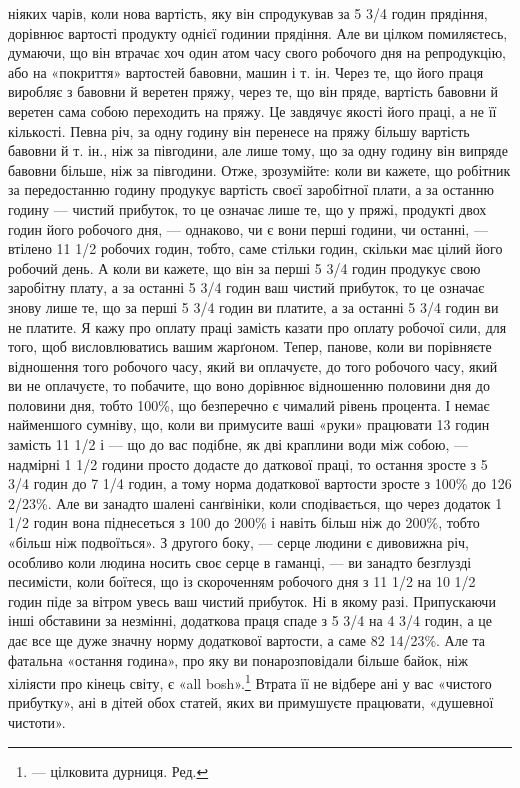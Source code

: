 ніяких чарів, коли нова вартість, яку він спродукував за 5 3/4 годин прядіння, дорівнює вартості
продукту однієї годинии прядіння. Але ви цілком помиляєтесь, думаючи, що він втрачає хоч один атом
часу свого робочого дня на репродукцію, або на «покриття» вартостей бавовни, машин і т. ін. Через
те, що його праця виробляє з бавовни й веретен пряжу, через те, що він пряде, вартість бавовни й
веретен сама собою переходить на пряжу.
Це завдячує якості його праці, а не її кількості. Певна річ, за одну годину він перенесе на пряжу
більшу вартість бавовни й т. ін., ніж за півгодини, але лише тому, що за одну годину він випряде
бавовни більше, ніж за півгодини. Отже, зрозумійте: коли ви кажете, що робітник за передостанню
годину продукує вартість своєї заробітної плати, а за останню годину — чистий прибуток, то це
означає лише те, що у пряжі, продукті двох годин його робочого дня, — однаково, чи є вони перші
години, чи останні, — втілено 11 1/2 робочих годин, тобто, саме стільки годин, скільки має цілий
його робочий день. А коли ви кажете, що він за перші 5 3/4 годин продукує свою заробітну плату, а за
останні 5 3/4 годин ваш чистий прибуток, то це означає знову лише те, що за перші 5 3/4 годин ви
платите, а за останні 5 3/4 годин
ви не платите. Я кажу про оплату праці замість казати про оплату робочої сили, для того, щоб
висловлюватись вашим жарґоном. Тепер, панове, коли ви порівняєте відношення того робочого
часу, який ви оплачуєте, до того робочого часу, який ви не оплачуєте, то побачите, що воно дорівнює
відношенню половини дня до половини дня, тобто 100\%, що безперечно є чималий рівень процента. І
немає найменшого сумніву, що, коли ви примусите ваші «руки» працювати 13 годин замість 11 1/2 і — що
до вас подібне, як дві краплини води між собою, — надмірні 1 1/2 години просто додасте до даткової
праці, то остання зросте з 5 3/4 годин до 7 1/4 годин, а тому норма додаткової вартости зросте з
100\% до 126 2/23\%. Але ви занадто шалені санґвініки, коли сподівається, що через додаток 1 1/2 годин
вона піднесеться з 100 до 200\% і навіть більш ніж до 200\%, тобто «більш ніж подвоїться». З другого
боку, — серце людини є дивовижна річ, особливо коли людина носить своє серце в гаманці, — ви занадто
безглузді песимісти, коли боїтеся, що із скороченням робочого
дня з 11 1/2 на 10 1/2 годин піде за вітром увесь ваш чистий прибуток. Ні в якому разі. Припускаючи
інші обставини за незмінні,
додаткова праця спаде з 5 3/4 на 4 3/4 годин, а це дає все ще дуже значну норму додаткової вартости,
а саме 82 14/23\%. Але та фатальна «остання година», про яку ви понарозповідали більше байок, ніж
хіліясти про кінець світу, є «all bosh».\footnote*{
— цілковита дурниця. Ред.
} Втрата її не відбере ані у вас «чистого прибутку», ані в
дітей обох статей, яких ви примушуєте працювати, «душевної чистоти».